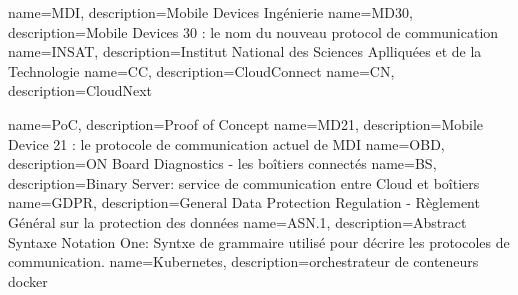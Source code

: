 {
	name=MDI,
	description={Mobile Devices Ingénierie}
}
 {
	name=MD30,
	description={Mobile Devices 30 : le nom du nouveau protocol de communication }
}
 {
	name=INSAT,
	description={Institut National des Sciences Aplliquées et de la Technologie}
}
 {
	name=CC,
	description={CloudConnect}
}
 {
	name=CN,
	description={CloudNext}
}

 {
	name=PoC,
	description={Proof of Concept}
}
 {
	name=MD21,
	description={Mobile Device 21 : le protocole de communication actuel de MDI}
}
 {
	name=OBD,
	description={ON Board Diagnostics - les boîtiers connectés }
}
 {
	name=BS,
	description={Binary Server: service de communication entre Cloud et boîtiers}
}
 {
	name=GDPR,
	description={General Data Protection Regulation - Règlement Général sur la protection des données\cite{gdpr} }
}
 {
	name=ASN.1,
	description={Abstract Syntaxe Notation One: Syntxe de grammaire utilisé pour décrire les protocoles de communication.}
}
 {
	name=Kubernetes,
	description={orchestrateur de conteneurs docker}
}